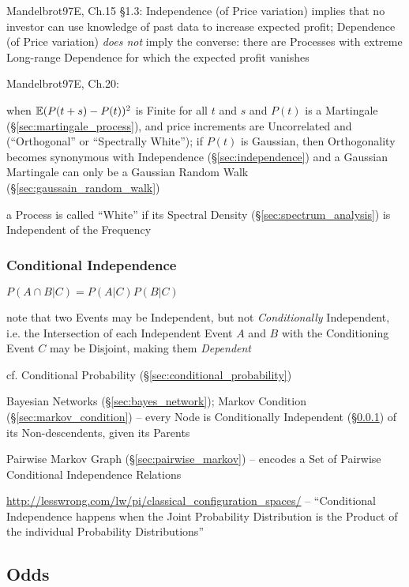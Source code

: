 Mandelbrot97E, Ch.15 \S 1.3: Independence (of Price variation) implies that no
investor can use knowledge of past data to increase expected profit; Dependence
(of Price variation) \emph{does not} imply the converse: there are Processes
with extreme Long-range Dependence for which the expected profit vanishes

Mandelbrot97E, Ch.20:

when $\mathbb{E}(P(t + s) - P(t))^2$ is Finite for all $t$ and $s$ and $P(t)$ is a
Martingale (\S\ref{sec:martingale_process}), and price increments are
Uncorrelated and (``Orthogonal'' or ``Spectrally White'');
if $P(t)$ is Gaussian, then Orthogonality becomes synonymous with Independence
(\S\ref{sec:independence}) and a Gaussian Martingale can only be a Gaussian
Random Walk (\S\ref{sec:gaussain_random_walk})

a Process is called ``White'' if its Spectral Density
(\S\ref{sec:spectrum_analysis}) is Independent of the Frequency



\subsubsection{Conditional Independence}\label{sec:conditional_independence}

$P(A \cap B | C) = P(A|C)P(B|C)$

note that two Events may be Independent, but not \emph{Conditionally}
Independent, i.e. the Intersection of each Independent Event $A$ and $B$ with
the Conditioning Event $C$ may be Disjoint, making them \emph{Dependent}

\fist cf. Conditional Probability (\S\ref{sec:conditional_probability})

\fist Bayesian Networks (\S\ref{sec:bayes_network});
Markov Condition (\S\ref{sec:markov_condition}) -- every Node is Conditionally
Independent (\S\ref{sec:conditional_independence}) of its Non-descendents, given
its Parents

\fist Pairwise Markov Graph (\S\ref{sec:pairwise_markov}) -- encodes a Set
of Pairwise Conditional Independence Relations

\url{http://lesswrong.com/lw/pi/classical_configuration_spaces/}
-- ``Conditional Independence happens when the Joint Probability Distribution
is the Product of the individual Probability Distributions''



\subsection{Odds}\label{sec:odds}

